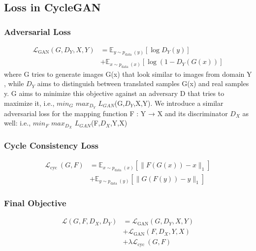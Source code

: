 \subsection{Loss in CycleGAN}
\subsubsection{Adversarial Loss}
\begin{equation}
\begin{aligned}
\mathcal{L}_{\mathrm{GAN}}\left(G, D_Y, X, Y\right) &=\mathbb{E}_{y \sim p_{\text {data }}(y)}\left[\log D_Y(y)\right] \\
&+\mathbb{E}_{x \sim p_{\text {data }}(x)}\left[\log \left(1-D_Y(G(x))\right]\right.
\end{aligned}
\end{equation}
where G tries to generate images G(x) that look similar to images from domain Y , while $D_Y$ aims to distinguish between translated samples G(x) and real samples y. G aims to minimize this objective against an adversary D that tries to maximize it, i.e., $min_G$ $max_D_Y$ $L_{GAN}$(G,$D_Y$,X,Y). We introduce a similar adversarial loss for the mapping function F : Y → X and its discriminator $D_X$ as well: i.e., $min_F$ $max_D_X$ $L_{G A N}$(F,$D_X$,Y,X)
\subsubsection{Cycle Consistency Loss}

\begin{equation}
\begin{aligned}
\mathcal{L}_{\text {cyc }}(G, F) &=\mathbb{E}_{x \sim p_{\text {data }}(x)}\left[\|F(G(x))-x\|_1\right] \\
&+\mathbb{E}_{y \sim p_{\text {data }}(y)}\left[\|G(F(y))-y\|_1\right]
\end{aligned}
\end{equation}
\subsubsection{Final Objective}
\begin{equation}
\begin{aligned}
\mathcal{L}\left(G, F, D_X, D_Y\right) &=\mathcal{L}_{\mathrm{GAN}}\left(G, D_Y, X, Y\right) \\
&+\mathcal{L}_{\mathrm{GAN}}\left(F, D_X, Y, X\right) \\
&+\lambda \mathcal{L}_{\text {cyc }}(G, F)
\end{aligned}
\end{equation}


